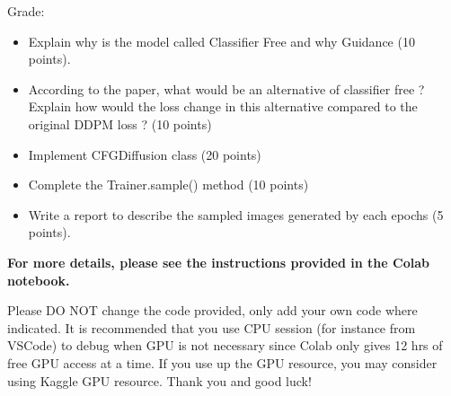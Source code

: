 \documentclass[12pt]{article}
\theoremstyle{definition}
\begin{document}
Grade:
\begin{itemize}
    \item Explain why is the model called Classifier Free  and why Guidance (10 points).
    \item According to the paper, what would be an alternative of classifier free ? Explain how would the loss change in this alternative compared to the original DDPM loss ? (10 points)
    \item Implement CFGDiffusion class (20 points)
    \item Complete the Trainer.sample() method (10 points)
    \item Write a report to describe the sampled images generated by each epochs  (5 points).
\end{itemize}

\textbf{For more details, please see the instructions provided in the Colab notebook.}

Please DO NOT change the code provided, only add your own code where indicated. It is recommended that you use CPU session (for instance from VSCode) to debug when GPU is not necessary since Colab only gives 12 hrs of free GPU access at a time. If you use up the GPU resource, you may consider using Kaggle GPU resource. Thank you and good luck!
\end{document}
